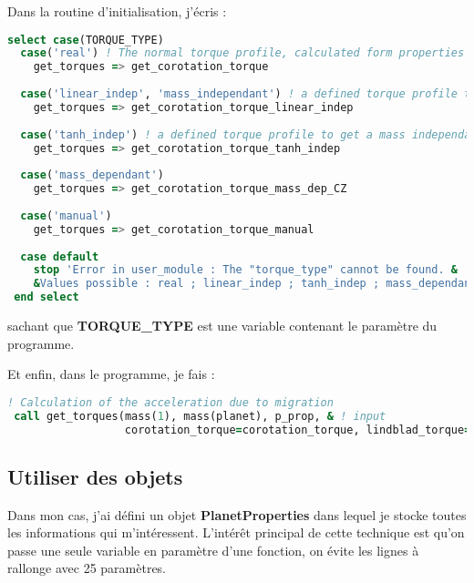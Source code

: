Dans la routine d'initialisation, j'écris : 
\begin{lstlisting}[language=Fortran]
select case(TORQUE_TYPE)
  case('real') ! The normal torque profile, calculated form properties of the disk
    get_torques => get_corotation_torque
  
  case('linear_indep', 'mass_independant') ! a defined torque profile to get a mass independant convergence zone
    get_torques => get_corotation_torque_linear_indep
  
  case('tanh_indep') ! a defined torque profile to get a mass independant convergence zone
    get_torques => get_corotation_torque_tanh_indep
  
  case('mass_dependant')
    get_torques => get_corotation_torque_mass_dep_CZ
    
  case('manual')
    get_torques => get_corotation_torque_manual
    
  case default
    stop 'Error in user_module : The "torque_type" cannot be found. &
    &Values possible : real ; linear_indep ; tanh_indep ; mass_dependant ; manual'
 end select
\end{lstlisting}
sachant que \textbf{TORQUE\_TYPE} est une variable contenant le paramètre du programme.

Et enfin, dans le programme, je fais : 
\begin{lstlisting}[language=Fortran]
! Calculation of the acceleration due to migration
 call get_torques(mass(1), mass(planet), p_prop, & ! input
                  corotation_torque=corotation_torque, lindblad_torque=lindblad_torque, Gamma_0=torque_ref, ecc_corot=ecc_corot) ! Output
\end{lstlisting}

\subsection{Utiliser des objets}
Dans mon cas, j'ai défini un objet \textbf{PlanetProperties} dans lequel je stocke toutes les informations qui m'intéressent. L'intérêt principal de cette technique est qu'on passe une seule variable en paramètre d'une fonction, on évite les lignes à rallonge avec 25 paramètres. 

